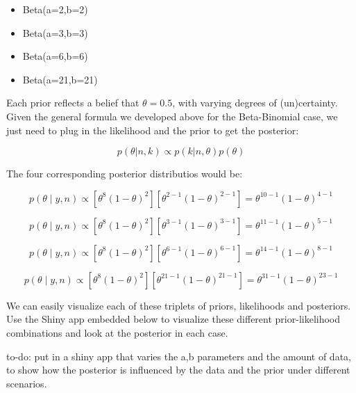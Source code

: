 \documentclass[12pt,]{krantz}
\providecommand{\tightlist}{%
  \setlength{\itemsep}{0pt}\setlength{\parskip}{0pt}}
\theoremstyle{definition}
\theoremstyle{definition}
\theoremstyle{definition}
\theoremstyle{remark}
\let\BeginKnitrBlock\begin \let\EndKnitrBlock\end
\begin{document}
\begin{itemize}
\tightlist
\item
  Beta(a=2,b=2)
\item
  Beta(a=3,b=3)
\item
  Beta(a=6,b=6)
\item
  Beta(a=21,b=21)
\end{itemize}

Each prior reflects a belief that \(\theta=0.5\), with varying degrees of (un)certainty. Given the general formula we developed above for the Beta-Binomial case, we just need to plug in the likelihood and the prior to get the posterior:

\begin{equation}
p(\theta | n,k) \propto p(k |n,\theta) p(\theta)
\end{equation}

The four corresponding posterior distributios would be:

\begin{equation}
p(\theta\mid y,n) \propto [\theta^{8} (1-\theta)^{2}] [\theta^{2-1}(1-\theta)^{2-1}] = \theta^{10-1} (1-\theta)^{4-1}
\end{equation}

\begin{equation}
p(\theta\mid y,n) \propto [\theta^{8} (1-\theta)^{2}] [\theta^{3-1}(1-\theta)^{3-1}] = \theta^{11-1} (1-\theta)^{5-1}
\end{equation}

\begin{equation}
p(\theta\mid y,n) \propto [\theta^{8} (1-\theta)^{2}] [\theta^{6-1}(1-\theta)^{6-1}] = \theta^{14-1} (1-\theta)^{8-1}
\end{equation}

\begin{equation}
p(\theta\mid y,n) \propto [\theta^{8} (1-\theta)^{2}] [\theta^{21-1}(1-\theta)^{21-1}] = \theta^{31-1} (1-\theta)^{23-1}
\end{equation}

We can easily visualize each of these triplets of priors, likelihoods and posteriors. Use the Shiny app embedded below to visualize these different prior-likelihood combinations and look at the posterior in each case.

\BeginKnitrBlock{rmdnote}
to-do: put in a shiny app that varies the a,b parameters and the amount of data, to show how the posterior is influenced by the data and the prior under different scenarios.
\EndKnitrBlock{rmdnote}
\end{document}
